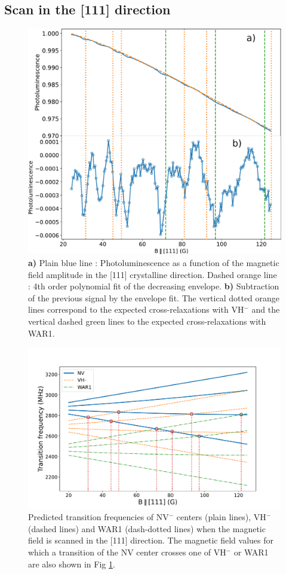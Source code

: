 \documentclass[9pt,twocolumn,twoside]{revtex4-1}
\begin{document}
\subsection{Scan in the [111] direction}
\begin{figure}
\includegraphics[width=\linewidth]{scan_111_PL}
\caption{\textbf{a)} Plain blue line : Photoluminescence as a function of the magnetic field amplitude in the [111] crystalline direction. Dashed orange line : 4th order polynomial fit of the decreasing envelope. \textbf{b)} Subtraction of the previous signal by the envelope fit. The vertical dotted orange lines correspond to the expected cross-relaxations with VH$^-$ and the vertical dashed green lines to the expected cross-relaxations with WAR1.}\label{scan_PL}
\end{figure}

\begin{figure}
\includegraphics[width=\linewidth]{Transis_111_VHWAR}
\caption{Predicted transition frequencies of NV$^-$ centers (plain lines), VH$^-$ (dashed lines) and WAR1 (dash-dotted lines) when the magnetic field is scanned in the [111] direction. The magnetic field values for which  a transition of the NV center crosses one of VH$^-$ or WAR1 are also shown in Fig \ref{scan_PL}.}\label{transis_VHWAR}
\end{figure}
\end{document}
